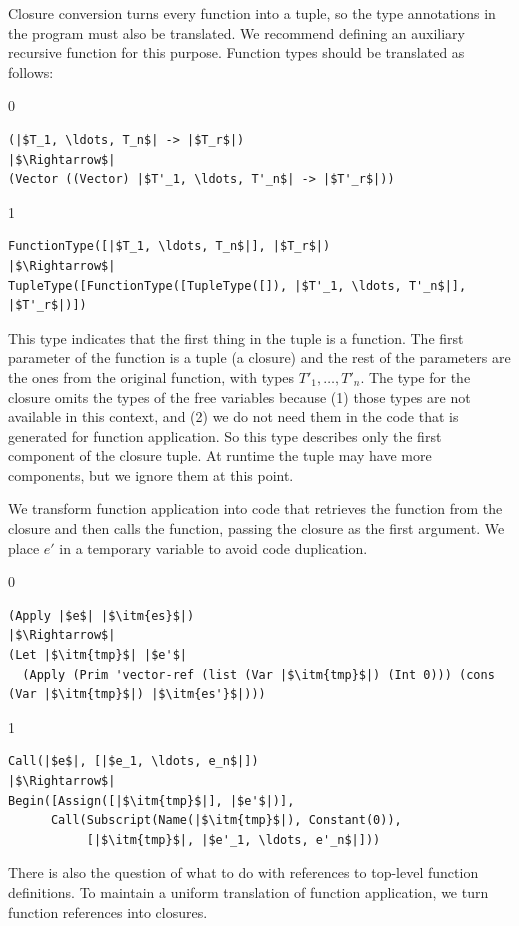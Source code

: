 \documentclass[7x10]{TimesAPriori_MIT}%
\def\racketEd{0}
\def\pythonEd{1}
\def\edition{1}
\newcommand{\pythonColor}[0]{}
\numberwithin{theorem}{chapter}
\numberwithin{definition}{chapter}
\numberwithin{equation}{chapter}
\begin{document}
Closure conversion turns every function into a tuple, so the type
annotations in the program must also be translated.  We recommend
defining an auxiliary recursive function for this purpose.  Function
types should be translated as follows:
%
{\if\edition\racketEd
\begin{lstlisting}
(|$T_1, \ldots, T_n$| -> |$T_r$|)
|$\Rightarrow$|  
(Vector ((Vector) |$T'_1, \ldots, T'_n$| -> |$T'_r$|))
\end{lstlisting}
\fi}
{\if\edition\pythonEd\pythonColor
\begin{lstlisting}
FunctionType([|$T_1, \ldots, T_n$|], |$T_r$|)
|$\Rightarrow$|  
TupleType([FunctionType([TupleType([]), |$T'_1, \ldots, T'_n$|], |$T'_r$|)])
\end{lstlisting}
\fi}
%
This type indicates that the first thing in the tuple is a
function. The first parameter of the function is a tuple (a closure)
and the rest of the parameters are the ones from the original
function, with types $T'_1, \ldots, T'_n$.  The type for the closure
omits the types of the free variables because (1) those types are not
available in this context, and (2) we do not need them in the code that
is generated for function application. So this type describes only the
first component of the closure tuple. At runtime the tuple may have
more components, but we ignore them at this point.

We transform function application into code that retrieves the
function from the closure and then calls the function, passing the
closure as the first argument. We place $e'$ in a temporary variable
to avoid code duplication.
\begin{center}
\begin{minipage}{\textwidth}
{\if\edition\racketEd
\begin{lstlisting}
(Apply |$e$| |$\itm{es}$|)
|$\Rightarrow$|
(Let |$\itm{tmp}$| |$e'$|
  (Apply (Prim 'vector-ref (list (Var |$\itm{tmp}$|) (Int 0))) (cons (Var |$\itm{tmp}$|) |$\itm{es'}$|)))
\end{lstlisting}
\fi}
%
{\if\edition\pythonEd\pythonColor
\begin{lstlisting}
Call(|$e$|, [|$e_1, \ldots, e_n$|])
|$\Rightarrow$|
Begin([Assign([|$\itm{tmp}$|], |$e'$|)],
      Call(Subscript(Name(|$\itm{tmp}$|), Constant(0)),
           [|$\itm{tmp}$|, |$e'_1, \ldots, e'_n$|]))
\end{lstlisting}
\fi}
\end{minipage}
\end{center}

There is also the question of what to do with references to top-level
function definitions. To maintain a uniform translation of function
application, we turn function references into closures.
\end{document}
